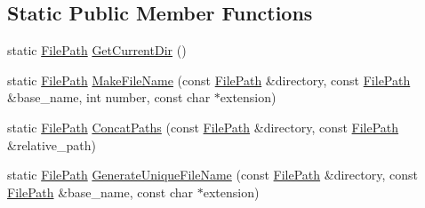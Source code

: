 \subsection*{Static Public Member Functions}
\begin{DoxyCompactItemize}
\item 
static \hyperlink{classtesting_1_1internal_1_1_file_path}{File\+Path} \hyperlink{classtesting_1_1internal_1_1_file_path_a0f7b48e493656679cb82a2b679620c4e}{Get\+Current\+Dir} ()
\item 
static \hyperlink{classtesting_1_1internal_1_1_file_path}{File\+Path} \hyperlink{classtesting_1_1internal_1_1_file_path_a1e7793eaae21c6629afe8be11064b111}{Make\+File\+Name} (const \hyperlink{classtesting_1_1internal_1_1_file_path}{File\+Path} \&directory, const \hyperlink{classtesting_1_1internal_1_1_file_path}{File\+Path} \&base\+\_\+name, int number, const char $\ast$extension)
\item 
static \hyperlink{classtesting_1_1internal_1_1_file_path}{File\+Path} \hyperlink{classtesting_1_1internal_1_1_file_path_ad58aa6d8b160d0ba0b661f56f0980e26}{Concat\+Paths} (const \hyperlink{classtesting_1_1internal_1_1_file_path}{File\+Path} \&directory, const \hyperlink{classtesting_1_1internal_1_1_file_path}{File\+Path} \&relative\+\_\+path)
\item 
static \hyperlink{classtesting_1_1internal_1_1_file_path}{File\+Path} \hyperlink{classtesting_1_1internal_1_1_file_path_ab22637ea53e3918ec814dc6a5fecd1f9}{Generate\+Unique\+File\+Name} (const \hyperlink{classtesting_1_1internal_1_1_file_path}{File\+Path} \&directory, const \hyperlink{classtesting_1_1internal_1_1_file_path}{File\+Path} \&base\+\_\+name, const char $\ast$extension)
\end{DoxyCompactItemize}


